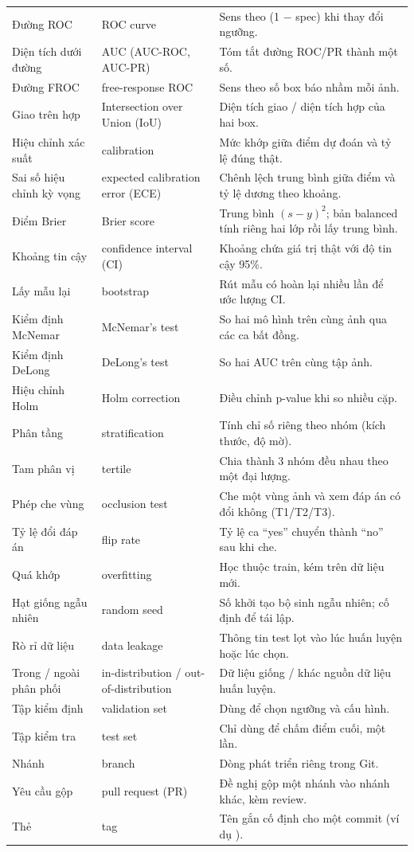 \begin{center}
\begin{longtable}{@{}P{3.6cm}P{3.6cm}P{7.4cm}@{}}
Đường ROC & ROC curve & Sens theo (1 $-$ spec) khi thay đổi ngưỡng. \\
Diện tích dưới đường & AUC (AUC-ROC, AUC-PR) & Tóm tắt đường ROC/PR thành một số. \\
Đường FROC & free-response ROC & Sens theo số box báo nhầm mỗi ảnh. \\
Giao trên hợp & Intersection over Union (IoU) & Diện tích giao / diện tích hợp của hai box. \\
Hiệu chỉnh xác suất & calibration & Mức khớp giữa điểm dự đoán và tỷ lệ đúng thật. \\
Sai số hiệu chỉnh kỳ vọng & expected calibration error (ECE) & Chênh lệch trung bình giữa điểm và tỷ lệ dương theo khoảng. \\
Điểm Brier & Brier score & Trung bình $(s-y)^2$; bản balanced tính riêng hai lớp rồi lấy trung bình. \\
Khoảng tin cậy & confidence interval (CI) & Khoảng chứa giá trị thật với độ tin cậy 95\%. \\
Lấy mẫu lại & bootstrap & Rút mẫu có hoàn lại nhiều lần để ước lượng CI. \\
Kiểm định McNemar & McNemar's test & So hai mô hình trên cùng ảnh qua các ca bất đồng. \\
Kiểm định DeLong & DeLong's test & So hai AUC trên cùng tập ảnh. \\
Hiệu chỉnh Holm & Holm correction & Điều chỉnh p-value khi so nhiều cặp. \\
Phân tầng & stratification & Tính chỉ số riêng theo nhóm (kích thước, độ mờ). \\
Tam phân vị & tertile & Chia thành 3 nhóm đều nhau theo một đại lượng. \\
Phép che vùng & occlusion test & Che một vùng ảnh và xem đáp án có đổi không (T1/T2/T3). \\
Tỷ lệ đổi đáp án & flip rate & Tỷ lệ ca ``yes'' chuyển thành ``no'' sau khi che. \\
Quá khớp & overfitting & Học thuộc train, kém trên dữ liệu mới. \\
Hạt giống ngẫu nhiên & random seed & Số khởi tạo bộ sinh ngẫu nhiên; cố định để tái lập. \\
Rò rỉ dữ liệu & data leakage & Thông tin test lọt vào lúc huấn luyện hoặc lúc chọn. \\
Trong / ngoài phân phối & in-distribution / out-of-distribution & Dữ liệu giống / khác nguồn dữ liệu huấn luyện. \\
Tập kiểm định & validation set & Dùng để chọn ngưỡng và cấu hình. \\
Tập kiểm tra & test set & Chỉ dùng để chấm điểm cuối, một lần. \\
Nhánh & branch & Dòng phát triển riêng trong Git. \\
Yêu cầu gộp & pull request (PR) & Đề nghị gộp một nhánh vào nhánh khác, kèm review. \\
Thẻ & tag & Tên gắn cố định cho một commit (ví dụ ). \\
\bottomrule
\end{longtable}
\end{center}
